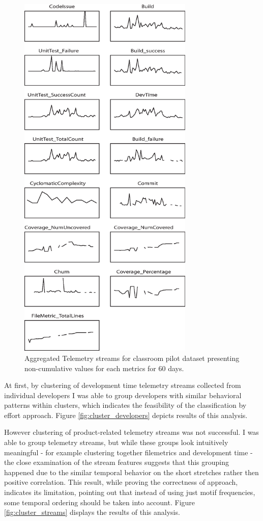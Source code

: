 \documentclass{sig-alternate}
\begin{document}
\begin{figure}[htpb]
   \centering
   \includegraphics[height=180mm]{telemetry_streams.eps}
   \caption{Aggregated Telemetry streams for classroom pilot dataset presenting non-cumulative values for each metrics for 60 days.}
   \label{fig:streams}
\end{figure}

At first, by clustering of development time telemetry streams collected from individual developers I was able to group developers with similar behavioral patterns within clusters, which indicates the feasibility of the classification by effort approach. Figure \ref{fig:cluster_developers} depicts results of this analysis.

However clustering of product-related telemetry streams was not successful. I was able to group telemetry streams, but while these groups look intuitively meaningful - for example clustering together filemetrics and development time - the close examination of the stream features suggests that this grouping happened due to the similar temporal behavior on the short stretches rather then positive correlation. This result, while proving the correctness of approach, indicates its limitation, pointing out that instead of using just motif frequencies, some temporal ordering should be taken into account. Figure \ref{fig:cluster_streams} displays the results of this analysis.
\end{document}
